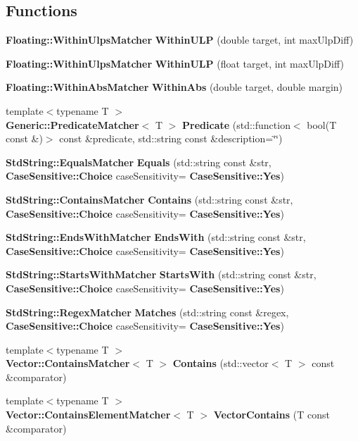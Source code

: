 \subsection*{Functions}
\begin{DoxyCompactItemize}
\item 
\textbf{ Floating\+::\+Within\+Ulps\+Matcher} \textbf{ Within\+U\+LP} (double target, int max\+Ulp\+Diff)
\item 
\textbf{ Floating\+::\+Within\+Ulps\+Matcher} \textbf{ Within\+U\+LP} (float target, int max\+Ulp\+Diff)
\item 
\textbf{ Floating\+::\+Within\+Abs\+Matcher} \textbf{ Within\+Abs} (double target, double margin)
\item 
{\footnotesize template$<$typename T $>$ }\\\textbf{ Generic\+::\+Predicate\+Matcher}$<$ T $>$ \textbf{ Predicate} (std\+::function$<$ bool(T const \&)$>$ const \&predicate, std\+::string const \&description=\char`\"{}\char`\"{})
\item 
\textbf{ Std\+String\+::\+Equals\+Matcher} \textbf{ Equals} (std\+::string const \&str, \textbf{ Case\+Sensitive\+::\+Choice} case\+Sensitivity=\textbf{ Case\+Sensitive\+::\+Yes})
\item 
\textbf{ Std\+String\+::\+Contains\+Matcher} \textbf{ Contains} (std\+::string const \&str, \textbf{ Case\+Sensitive\+::\+Choice} case\+Sensitivity=\textbf{ Case\+Sensitive\+::\+Yes})
\item 
\textbf{ Std\+String\+::\+Ends\+With\+Matcher} \textbf{ Ends\+With} (std\+::string const \&str, \textbf{ Case\+Sensitive\+::\+Choice} case\+Sensitivity=\textbf{ Case\+Sensitive\+::\+Yes})
\item 
\textbf{ Std\+String\+::\+Starts\+With\+Matcher} \textbf{ Starts\+With} (std\+::string const \&str, \textbf{ Case\+Sensitive\+::\+Choice} case\+Sensitivity=\textbf{ Case\+Sensitive\+::\+Yes})
\item 
\textbf{ Std\+String\+::\+Regex\+Matcher} \textbf{ Matches} (std\+::string const \&regex, \textbf{ Case\+Sensitive\+::\+Choice} case\+Sensitivity=\textbf{ Case\+Sensitive\+::\+Yes})
\item 
{\footnotesize template$<$typename T $>$ }\\\textbf{ Vector\+::\+Contains\+Matcher}$<$ T $>$ \textbf{ Contains} (std\+::vector$<$ T $>$ const \&comparator)
\item 
{\footnotesize template$<$typename T $>$ }\\\textbf{ Vector\+::\+Contains\+Element\+Matcher}$<$ T $>$ \textbf{ Vector\+Contains} (T const \&comparator)

\end{DoxyCompactItemize}
